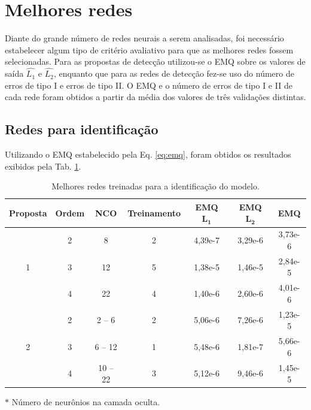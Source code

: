\section{Melhores redes}
Diante do grande número de redes neurais a serem analisadas, foi necessário
estabelecer algum tipo de critério avaliativo para que as melhores redes fossem
selecionadas. Para as propostas de detecção utilizou-se o EMQ sobre os valores
de saída $\widehat{L_1}$ e $\widehat{L_2}$, enquanto que para as redes de
detecção fez-se uso do número de erros de tipo I e erros de tipo II.  O EMQ e o
número de erros de tipo I e II de cada rede foram obtidos a partir da média dos
valores de três validações distintas.

\subsection{Redes para identificação}
Utilizando o EMQ estabelecido pela Eq. \ref{eq:emq}, foram obtidos os resultados
exibidos pela Tab. \ref{tab:melhores_rnas_ident}.

\begin{table}[htb]
\small
\centering
\caption{Melhores redes treinadas para a identificação do modelo.}
\label{tab:melhores_rnas_ident}
\vspace{0.25cm}
\begin{threeparttable}
\begin{tabular}{|c|c|c|c|c|c|c|}
\hline
{\bf Proposta} & 
{\bf Ordem} & 
{\bf NCO\tnote{$*$}} & 
{\bf Treinamento} &
{\bf EMQ $\mathbf{L_1}$} & 
{\bf EMQ $\mathbf{L_2}$} & 
{\bf EMQ}\\
\hline
\hline
\multirow{3}{*}{1} &
\cellcolor[gray]{0.9} 2 &
\cellcolor[gray]{0.9} 8 &
\cellcolor[gray]{0.9}2 &
\cellcolor[gray]{0.9} 4,39e-7 &
\cellcolor[gray]{0.9} 3,29e-6 &
\cellcolor[gray]{0.9} 3,73e-6\\
\cline{2-7}
&3 & 12 & 5 & 1,38e-5 & 1,46e-5 & 2,84e-5\\
\cline{2-7}
&4 & 22 & 4 & 1,40e-6 & 2,60e-6 & 4,01e-6\\
\hline
\multirow{3}{*}{2} & 2 & 2 -- 6 & 2 & 5,06e-6 & 7,26e-6 & 1,23e-5\\
\cline{2-7}
& 3 & 6 -- 12 & 1 & 5,48e-6 & 1,81e-7 & 5,66e-6\\
\cline{2-7}
& 4 & 10 -- 22 & 3 & 5,12e-6 & 9,46e-6 & 1,45e-5\\
\hline
\end{tabular}
\begin{tablenotes}
\item [$*$] Número de neurônios na camada oculta.
\end{tablenotes}
\end{threeparttable}
\end{table}

